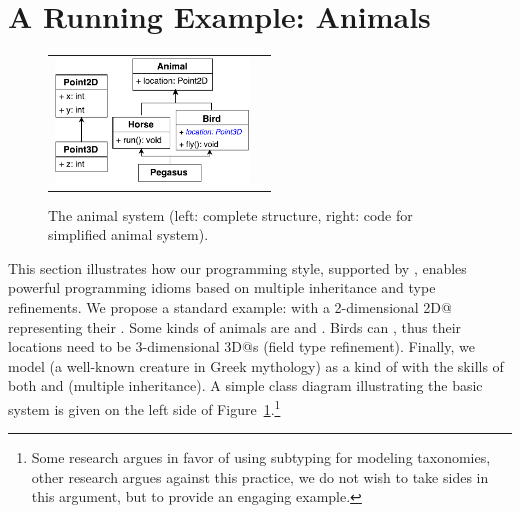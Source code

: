 \section{A Running Example: Animals}\label{sec:ep}
\begin{figure}
\centering
\saveSpaceFig
\begin{tabular}{c|c}
\includegraphics[height=3.3cm]{pdfs/PegasusDetail.pdf}\hspace{0pt} &
\begin{minipage}{7cm}
\vspace{-95pt}
\end{minipage}
\end{tabular}
\caption{The animal system (left: complete structure, right: code for simplified animal system).}\label{fig:pegasus}
\saveSpaceFig
\end{figure}

This section illustrates how our programming style, supported by 
\mixinAnn{}, enables powerful programming idioms based on multiple
inheritance and type refinements.  We propose a standard example:
\Q@Animal@s with a 2-dimensional \Q@Point2D@ representing their
\Q@location@.  Some kinds of animals are \Q@Horses@ and \Q@Bird@s.
Birds can \Q@fly@, thus their locations need to be 3-dimensional
\Q@Point3D@s (field type refinement). Finally, we model \Q@Pegasus@
(a well-known creature in Greek mythology) as a kind of
\Q@Animal@ with the skills of both \Q@Horse@s and \Q@Bird@s (multiple
inheritance). A simple class diagram illustrating the basic system is
given on the left side of Figure~\ref{fig:pegasus}.\footnote{Some
  research argues in favor of using subtyping for modeling taxonomies,
  other research argues against this practice, we do not wish to take
  sides in this argument, but to provide an engaging example.}


